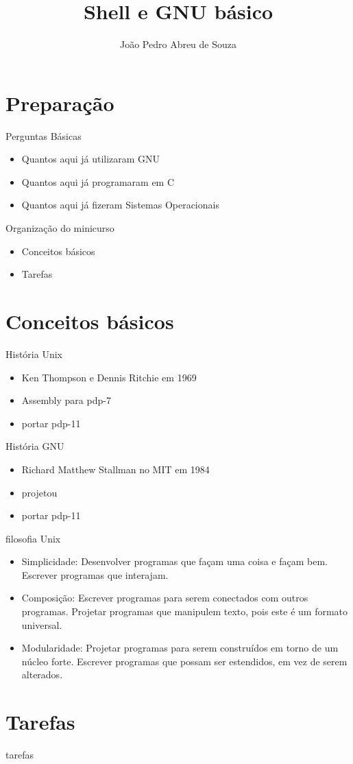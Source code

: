 \documentclass{beamer}
\title{Shell e GNU básico}
\author{João Pedro Abreu de Souza}
\begin{document}
\maketitle
\section{Preparação}
\begin{frame}{Perguntas Básicas}
	\begin{itemize}
		\item Quantos aqui já utilizaram GNU
		\pause
		\item Quantos aqui já programaram em C
		\pause
		\item Quantos aqui já fizeram Sistemas Operacionais
	\end{itemize}
\end{frame}
\begin{frame}{Organização do minicurso}
 \begin{itemize}
     \item Conceitos básicos
     \item Tarefas
 \end{itemize}
\end{frame}
\section{Conceitos básicos}
\begin{frame}{História Unix}
	\begin{itemize}
		\item Ken Thompson e Dennis Ritchie em 1969
		\item Assembly para pdp-7
		\item portar pdp-11
	\end{itemize}
\end{frame}
\begin{frame}{História GNU}
	\begin{itemize}
		\item Richard Matthew Stallman no MIT em 1984
		\item projetou 
		\item portar pdp-11
	\end{itemize}
\end{frame}
\begin{frame}{filosofia Unix}
	\begin{itemize}
		\item Simplicidade: Desenvolver programas que façam uma coisa e façam bem. Escrever programas que interajam.
		\item Composição: Escrever programas para serem conectados com outros programas. Projetar programas que manipulem texto, pois este é um formato universal.
		\item Modularidade: Projetar programas para serem construídos em torno de um núcleo forte. Escrever programas que possam ser estendidos, em vez de serem alterados.
	\end{itemize}
\end{frame}
\section{Tarefas}
\begin{frame}{tarefas}
	
\end{frame}
\end{document}
